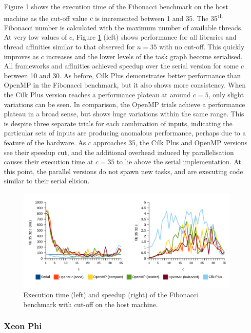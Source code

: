 \documentclass{report}
\begin{document}
Figure \ref{Fig:fibcutoffhost} shows the execution time of the Fibonacci benchmark on the host machine as the cut-off value \(c\) is incremented between 1 and 35. The 35\textsuperscript{th} Fibonacci number is calculated with the maximum number of available threads. At very low values of \(c\), Figure \ref{Fig:fibcutoffhost} (left) shows performance for all libraries and thread affinities similar to that observed for \(n=35\) with no cut-off. This quickly improves as \(c\) increases and the lower levels of the task graph become serialised. All frameworks and affinities achieved speedup over the serial version for some \(c\) between 10 and 30. As before, Cilk Plus demonstrates better performance than OpenMP in the Fibonacci benchmark, but it also shows more consistency. When the Cilk Plus version reaches a performance plateau at around \(c=5\), only slight variations can be seen. In comparison, the OpenMP trials achieve a performance plateau in a broad sense, but shows huge variations within the same range. This is despite three separate trials for each combination of inputs, indicating the particular sets of inputs are producing anomalous performance, perhaps due to a feature of the hardware. As \(c\) approaches 35, the Cilk Plus and OpenMP versions see their speedup cut, and the additional overhead induced by parallelisation causes their execution time at \(c=35\) to lie above the serial implementation. At this point, the parallel versions do not spawn new tasks, and are executing code similar to their serial elision.
\noindent
\begin{figure}[t!]
	\includegraphics[width=\linewidth]{../../charts/intel64/fib_cutoff}
	\caption{Execution time (left) and speedup (right) of the Fibonacci benchmark with cut-off on the host machine.}
	\label{Fig:fibcutoffhost}
\end{figure}

\subsubsection{Xeon Phi}
\end{document}
